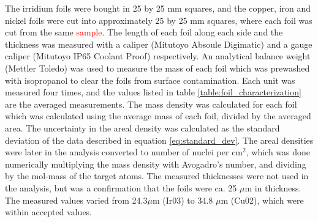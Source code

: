 \noindent 
The irridium foils were bought in 25 by 25 mm squares, and the copper, iron and nickel foils were cut into approximately 25 by 25 mm squares, where each foil was cut from the same \textcolor{red}{sample}. The length of each foil along each side and the thickness was measured with a caliper (Mitutoyo Absoule Digimatic) and a gauge caliper (Mitutoyo IP65 Coolant Proof) respectively. An analytical balance weight (Mettler Toledo) was used to measure the mass of each foil which was prewashed with isopropanol to clear the foils from surface contamination. Each unit was measured four times, and the values listed in table \ref{table:foil_characterization} are the averaged measurements. The mass density was calculated for each foil which was calculated using the average mass of each foil, divided by the averaged area. The uncertainty in the areal density was calculated as the standard deviation of the data described in equation \ref{eq:standard_dev}. The areal densities were later in the analysis converted to number of nuclei per cm$^2$, which was done numerically multiplying the mass density with Avogadro's number, and dividing by the mol-mass of the target atoms. The measured thicknesses were not used in the analysis, but was a confirmation that the foils were ca. 25 $\mu$m in thickness. The measured values varied from 24.3$\mu$m (Ir03) to 34.8 $\mu$m (Cu02), which were within accepted values. 



